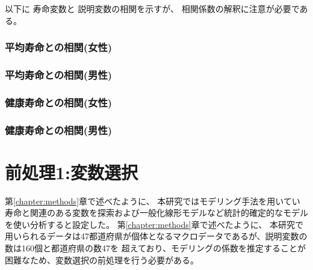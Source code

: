\documentclass[a4j,11pt,mc]{jreport}
\begin{document}
以下に
寿命変数と
説明変数の相関を示すが、
相関係数の解釈に注意が必要である。

\subsection{平均寿命との相関(女性)}




\subsection{平均寿命との相関(男性)}




\subsection{健康寿命との相関(女性)}




\subsection{健康寿命との相関(男性)}
















%

%






\chapter{前処理1:変数選択}\label{chapter:VarSelection}

第\ref{chapter:methods}章で述べたように、
本研究ではモデリング手法を用いてい
寿命と関連のある変数を探索および一般化線形モデルなど統計的確定的なモデルを使い分析すると設定した。
第\ref{chapter:methods}章で述べたように、
本研究で用いられるデータは47都道府県が個体となるマクロデータであるが、説明変数の数は160個と都道府県の数47を
超えており、モデリングの係数を推定することが困難なため、変数選択の前処理を行う必要がある。
\end{document}
